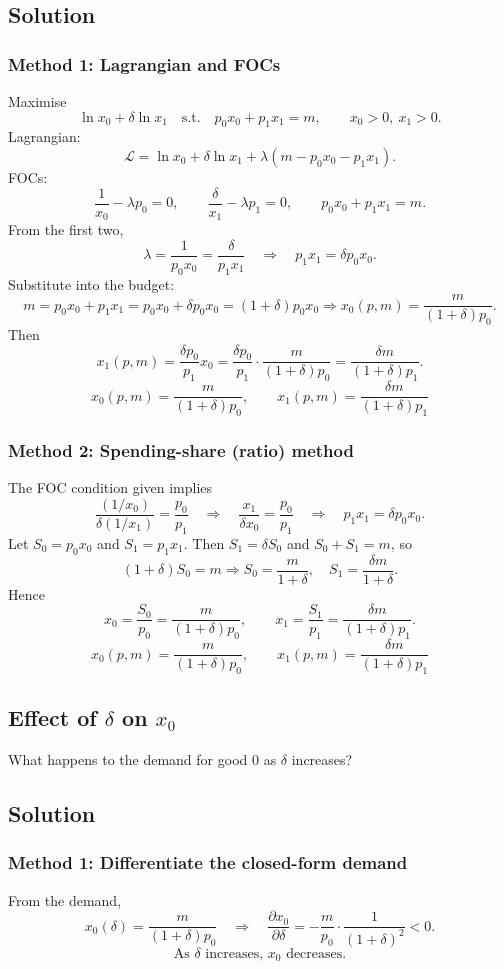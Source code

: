 \documentclass[12pt]{article}
\begin{document}
\subsection*{Solution}
\subsubsection*{Method 1: Lagrangian and FOCs}
Maximise
\[
\ln x_0+\delta \ln x_1
\quad\text{s.t.}\quad
p_0x_0+p_1x_1=m,\qquad x_0>0,\ x_1>0.
\]
Lagrangian:
\[
\mathcal{L}=\ln x_0+\delta \ln x_1+\lambda(m-p_0x_0-p_1x_1).
\]
FOCs:
\[
\frac{1}{x_0}-\lambda p_0=0,\qquad
\frac{\delta}{x_1}-\lambda p_1=0,\qquad
p_0x_0+p_1x_1=m.
\]
From the first two,
\[
\lambda=\frac{1}{p_0x_0}=\frac{\delta}{p_1x_1}\quad\Rightarrow\quad p_1x_1=\delta p_0x_0.
\]
Substitute into the budget:
\[
m=p_0x_0+p_1x_1=p_0x_0+\delta p_0x_0=(1+\delta)p_0x_0
\Rightarrow
x_0(p,m)=\frac{m}{(1+\delta)p_0}.
\]
Then
\[
x_1(p,m)=\frac{\delta p_0}{p_1}x_0=\frac{\delta p_0}{p_1}\cdot \frac{m}{(1+\delta)p_0}
=\frac{\delta m}{(1+\delta)p_1}.
\]
\[
\boxed{\;x_0(p,m)=\frac{m}{(1+\delta)p_0},\qquad x_1(p,m)=\frac{\delta m}{(1+\delta)p_1}\;}
\]

\subsubsection*{Method 2: Spending-share (ratio) method}
The FOC condition given implies
\[
\frac{(1/x_0)}{\delta(1/x_1)}=\frac{p_0}{p_1}
\quad\Rightarrow\quad
\frac{x_1}{\delta x_0}=\frac{p_0}{p_1}
\quad\Rightarrow\quad
p_1x_1=\delta p_0x_0.
\]
Let \(S_0=p_0x_0\) and \(S_1=p_1x_1\). Then \(S_1=\delta S_0\) and \(S_0+S_1=m\), so
\[
(1+\delta)S_0=m \Rightarrow S_0=\frac{m}{1+\delta},\quad S_1=\frac{\delta m}{1+\delta}.
\]
Hence
\[
x_0=\frac{S_0}{p_0}=\frac{m}{(1+\delta)p_0},\qquad
x_1=\frac{S_1}{p_1}=\frac{\delta m}{(1+\delta)p_1}.
\]
\[
\boxed{\;x_0(p,m)=\frac{m}{(1+\delta)p_0},\qquad x_1(p,m)=\frac{\delta m}{(1+\delta)p_1}\;}
\]

\subsection{Effect of \texorpdfstring{\(\delta\)}{delta} on \(x_0\)}
What happens to the demand for good 0 as \(\delta\) increases?

\subsection*{Solution}
\subsubsection*{Method 1: Differentiate the closed-form demand}
From the demand,
\[
x_0(\delta)=\frac{m}{(1+\delta)p_0}
\quad\Rightarrow\quad
\frac{\partial x_0}{\partial \delta}
=-\frac{m}{p_0}\cdot\frac{1}{(1+\delta)^2}<0.
\]
\[
\boxed{\;\text{As }\delta\text{ increases, }x_0\text{ decreases.}\;}
\]
\end{document}
